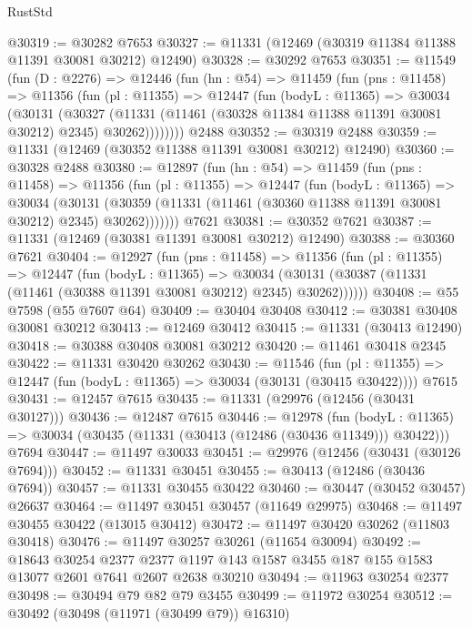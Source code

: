 \begin{lexlean}{RustStd}
\begin{coremodule}
@30319 := @30282 @7653
@30327 := @11331 (@12469 (@30319 @11384 @11388 @11391 @30081 @30212) @12490)
@30328 := @30292 @7653
@30351 := @11549
    (fun (D : @2276) =>
    @12446
      (fun (hn : @54) =>
      @11459
        (fun (pns : @11458) =>
        @11356
          (fun (pl : @11355) =>
          @12447
            (fun (bodyL : @11365) =>
            @30034
              (@30131
                (@30327
                  (@11331 (@11461 (@30328 @11384 @11388 @11391 @30081 @30212) @2345) @30262))))))))
    @2488
@30352 := @30319 @2488
@30359 := @11331 (@12469 (@30352 @11388 @11391 @30081 @30212) @12490)
@30360 := @30328 @2488
@30380 := @12897
    (fun (hn : @54) =>
    @11459
      (fun (pns : @11458) =>
      @11356
        (fun (pl : @11355) =>
        @12447
          (fun (bodyL : @11365) =>
          @30034
            (@30131
              (@30359 (@11331 (@11461 (@30360 @11388 @11391 @30081 @30212) @2345) @30262)))))))
    @7621
@30381 := @30352 @7621
@30387 := @11331 (@12469 (@30381 @11391 @30081 @30212) @12490)
@30388 := @30360 @7621
@30404 := @12927
    (fun (pns : @11458) =>
    @11356
      (fun (pl : @11355) =>
      @12447
        (fun (bodyL : @11365) =>
        @30034 (@30131 (@30387 (@11331 (@11461 (@30388 @11391 @30081 @30212) @2345) @30262))))))
@30408 := @55 @7598 (@55 @7607 @64)
@30409 := @30404 @30408
@30412 := @30381 @30408 @30081 @30212
@30413 := @12469 @30412
@30415 := @11331 (@30413 @12490)
@30418 := @30388 @30408 @30081 @30212
@30420 := @11461 @30418 @2345
@30422 := @11331 @30420 @30262
@30430 := @11546
    (fun (pl : @11355) => @12447 (fun (bodyL : @11365) => @30034 (@30131 (@30415 @30422))))
    @7615
@30431 := @12457 @7615
@30435 := @11331 (@29976 (@12456 (@30431 @30127)))
@30436 := @12487 @7615
@30446 := @12978
    (fun (bodyL : @11365) => @30034 (@30435 (@11331 (@30413 (@12486 (@30436 @11349))) @30422)))
    @7694
@30447 := @11497 @30033
@30451 := @29976 (@12456 (@30431 (@30126 @7694)))
@30452 := @11331 @30451
@30455 := @30413 (@12486 (@30436 @7694))
@30457 := @11331 @30455 @30422
@30460 := @30447 (@30452 @30457) @26637
@30464 := @11497 @30451 @30457 (@11649 @29975)
@30468 := @11497 @30455 @30422 (@13015 @30412)
@30472 := @11497 @30420 @30262 (@11803 @30418)
@30476 := @11497 @30257 @30261 (@11654 @30094)
@30492 := @18643
    @30254
    @2377
    @2377
    @1197
    @143
    @1587
    @3455
    @187
    @155
    @1583
    @13077
    @2601
    @7641
    @2607
    @2638
    @30210
@30494 := @11963 @30254 @2377
@30498 := @30494 @79 @82 @79 @3455
@30499 := @11972 @30254
@30512 := @30492
    (@30498 (@11971 (@30499 @79)) @16310)

\end{coremodule}
\end{lexlean}
